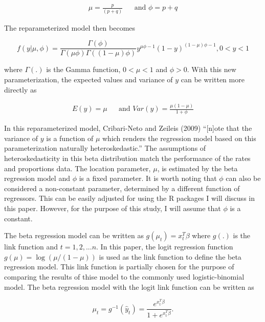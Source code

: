 \documentclass{svproc}
\begin{document}
\begin{eqnarray*}
\mu = \frac{p} {(p + q)} & & \text{and } \phi = p + q
\end{eqnarray*}

The reparameterized model then becomes 

\begin{equation}
f(y|\mu, \phi) = \frac{\Gamma (\phi)}{\Gamma (\mu \phi) \Gamma ((1-\mu)\phi)}y^{\mu\phi - 1}(1-y)^{(1-\mu)\phi-1},  0<y<1
\end{equation}

\bigskip

where $\Gamma(.)$ is the Gamma function, $0 < \mu < 1$ and $\phi > 0$. With this new parameterization, the expected values and variance of $y$ can be written more directly as 

\begin{eqnarray*}
E(y) = \mu & & \text{and } \label{vary} Var(y) = \frac{\mu(1-\mu)}{1+\phi}
\end{eqnarray*}

In this reparameterized model, Cribari-Neto and Zeileis (2009) \enquote{[n]ote that the variance of $y$ is a function of $\mu$ which renders the regression model based on this parameterization naturally heteroskedastic.} The assumptions of heteroskedasticity in this beta distribution match the performance of the rates and proportions data. The location parameter, $\mu$, is estimated by the beta regression model and $\phi$ is a fixed parameter. It is worth noting that $\phi$ can also be considered a non-constant parameter, determined by a different function of regressors. This can be easily adjusted for using the R packages I will discuss in this paper. However, for the purpose of this study, I will assume that $\phi$ is a constant.

The beta regression model can be written as $g(\mu_t) = x_t^T \beta$ where $g(.)$ is the link function and $t = 1,2,...n$. In this paper, the logit regression function $g(\mu) = \log({\mu}/{(1-\mu)})$ is used as the link function to define the beta regression model. This link function is partially chosen for the purpose of comparing the results of thise model to the commonly used logistic-binomial model. The beta regression model with the logit link function can be written as

\begin{equation}
\mu_t = g^{-1}(\hat{y}_t) = \frac{e^{x_t^T \beta}}{1+e^{x_t^T \beta}}.
\label{regbet}
\end{equation}
\end{document}
